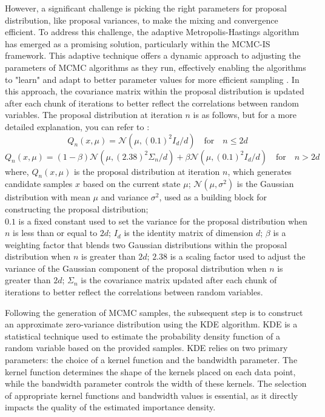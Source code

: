         However, a significant challenge is picking the right parameters for proposal distribution, like proposal variances, to make the mixing and convergence efficient. To address this challenge, the adaptive Metropolis-Hastings algorithm has emerged as a promising solution, particularly within the MCMC-IS framework. This adaptive technique offers a dynamic approach to adjusting the parameters of MCMC algorithms as they run, effectively enabling the algorithms to "learn" and adapt to better parameter values for more efficient sampling \cite{haario_adaptive_2001}. In this approach, the covariance matrix within the proposal distribution is updated after each chunk of iterations to better reflect the correlations between random variables. The proposal distribution at iteration $n$ is as follows, but for a more detailed explanation, you can refer to \cite{haario_adaptive_2001}:
        $$Q_n(x, \mu)=\mathcal{N}(\mu,{(0.1)}^2I_d/d)\quad \text{for} \quad n\le2d$$
        $$Q_n(x, \mu)=(1-\beta)\mathcal{N}(\mu,{(2.38)}^2\Sigma_n/d) + \beta\mathcal{N}(\mu,{(0.1)}^2I_d/d)\quad \text{for} \quad n>2d$$
        where,
        $Q_n(x, \mu)$ is the proposal distribution at iteration $n$, which generates candidate samples $x$ based on the current state $\mu$;
        $\mathcal{N}(\mu, \sigma^2)$ is the Gaussian distribution with mean $\mu$ and variance $\sigma^2$, used as a building block for constructing the proposal distribution;\\
        $0.1$ is a fixed constant used to set the variance for the proposal distribution when $n$ is less than or equal to $2d$;
        $I_d$ is the identity matrix of dimension $d$;       
        $\beta$ is a weighting factor that blends two Gaussian distributions within the proposal distribution when $n$ is greater than $2d$;      
        $2.38$ is a scaling factor used to adjust the variance of the Gaussian component of the proposal distribution when $n$ is greater than $2d$;        
        $\Sigma_n$ is the covariance matrix updated after each chunk of iterations to better reflect the correlations between random variables.        
        
        Following the generation of MCMC samples, the subsequent step is to construct an approximate zero-variance distribution using the KDE algorithm. KDE is a statistical technique used to estimate the probability density function of a random variable based on the provided samples. KDE relies on two primary parameters: the choice of a kernel function and the bandwidth parameter. The kernel function determines the shape of the kernels placed on each data point, while the bandwidth parameter controls the width of these kernels. The selection of appropriate kernel functions and bandwidth values is essential, as it directly impacts the quality of the estimated importance density.
        

        










